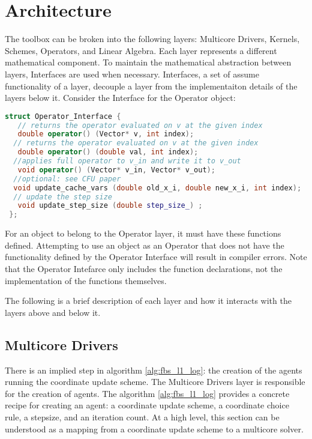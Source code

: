 \section{Architecture}

The toolbox can be broken into the following layers: Multicore Drivers, Kernels, Schemes, Operators, and Linear Algebra.
Each layer represents a different mathematical component. To maintain the mathematical abstraction between layers, Interfaces are used when necessary. 
Interfaces, a set of assume functionality of a layer, decouple a layer from the implementaiton details of the layers below it.
Consider the Interface for the Operator object:

\begin{lstlisting}[language=C++,label={Operator_Interface}]
struct Operator_Interface {
   // returns the operator evaluated on v at the given index
   double operator() (Vector* v, int index);
  // returns the operator evaluated on v at the given index
   double operator() (double val, int index);
  //applies full operator to v_in and write it to v_out
   void operator() (Vector* v_in, Vector* v_out);
  //optional: see CFU paper
  void update_cache_vars (double old_x_i, double new_x_i, int index);
  // update the step size
   void update_step_size (double step_size_) ;
 };
\end{lstlisting}

For an object to belong to the Operator layer, it must have these functions defined.
Attempting to use an object as an Operator that does not have the functionality defined by the Operator Interface will result in compiler errors.
Note that the Operator Intefarce only includes the function declarations, not the implementation of the functions themselves.

The following is a brief description of each layer and how it interacts with the layers above and below it.

\subsection{Multicore Drivers}

There is an implied step in algorithm \ref{alg:fbs_l1_log}: the creation of the agents running the coordinate update scheme.
The Multicore Drivers  layer is responsible for the creation of agents.
The  algorithm \ref{alg:fbs_l1_log} provides a concrete recipe for creating an agent: a coordinate update scheme, a coordinate choice rule, a stepsize, and an iteration count.
At a high level, this section can be understood as a mapping from a coordinate update scheme to a multicore solver.

